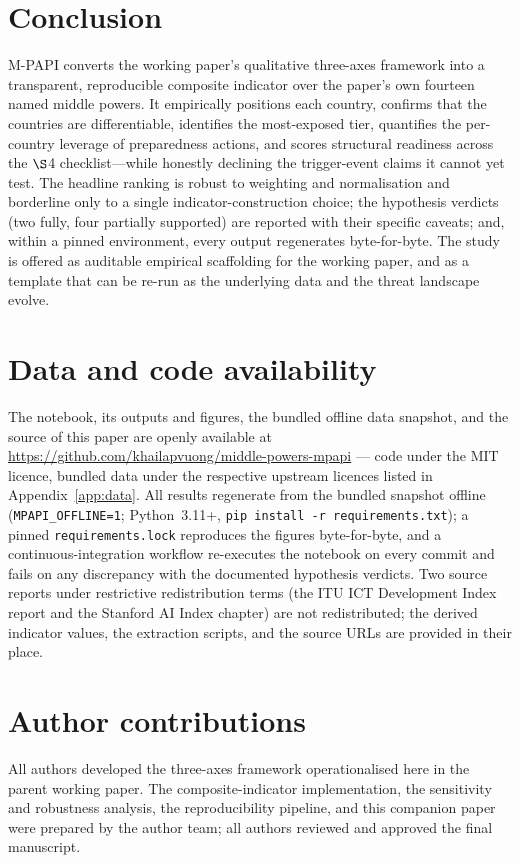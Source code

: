 \documentclass[11pt]{article}
\begin{document}
\section{Conclusion}
M-PAPI converts the working paper's qualitative three-axes framework into a transparent, reproducible composite indicator over the paper's own fourteen named middle powers. It empirically positions each country, confirms that the countries are differentiable, identifies the most-exposed tier, quantifies the per-country leverage of preparedness actions, and scores structural readiness across the $\S$4 checklist---while honestly declining the trigger-event claims it cannot yet test. The headline ranking is robust to weighting and normalisation and borderline only to a single indicator-construction choice; the hypothesis verdicts (two fully, four partially supported) are reported with their specific caveats; and, within a pinned environment, every output regenerates byte-for-byte. The study is offered as auditable empirical scaffolding for the working paper, and as a template that can be re-run as the underlying data and the threat landscape evolve.

\section*{Data and code availability}
The notebook, its outputs and figures, the bundled offline data snapshot, and the source of this paper are openly available at \url{https://github.com/khailapvuong/middle-powers-mpapi} --- code under the MIT licence, bundled data under the respective upstream licences listed in Appendix~\ref{app:data}. All results regenerate from the bundled snapshot offline (\texttt{MPAPI\_OFFLINE=1}; Python~3.11+, \texttt{pip install -r requirements.txt}); a pinned \texttt{requirements.lock} reproduces the figures byte-for-byte, and a continuous-integration workflow re-executes the notebook on every commit and fails on any discrepancy with the documented hypothesis verdicts. Two source reports under restrictive redistribution terms (the ITU ICT Development Index report and the Stanford AI Index chapter) are not redistributed; the derived indicator values, the extraction scripts, and the source URLs are provided in their place.

\section*{Author contributions}
All authors developed the three-axes framework operationalised here in the parent working paper. The composite-indicator implementation, the sensitivity and robustness analysis, the reproducibility pipeline, and this companion paper were prepared by the author team; all authors reviewed and approved the final manuscript.
\end{document}
